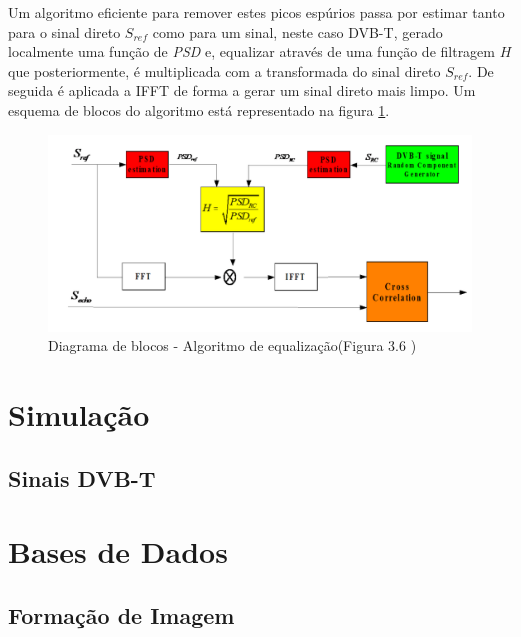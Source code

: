 Um algoritmo eficiente para remover estes picos espúrios passa por estimar tanto para o sinal direto $S_{ref}$ como para um sinal, neste caso \gls{DVB-T}, gerado localmente uma função de \textit{\gls{PSD}} e, equalizar através de uma função de filtragem $H$ que posteriormente, é multiplicada com a transformada do sinal direto $S_{ref}$. De seguida é aplicada a \gls{IFFT} de forma a gerar um sinal direto mais limpo. Um esquema de blocos do algoritmo está representado na figura \ref{fig:equal}.

\begin{figure}[h]
\centering
\includegraphics[scale=0.5]{chapters/ch4/assets/equal}
\caption[Diagrama de blocos - Algoritmo de equalização]{Diagrama de blocos - Algoritmo de equalização(Figura 3.6 \cite{Martorella})}
\label{fig:equal}
\end{figure}



\section{Simulação}

\subsection{Sinais DVB-T}




\section{Bases de Dados}

\subsection{Formação de Imagem}